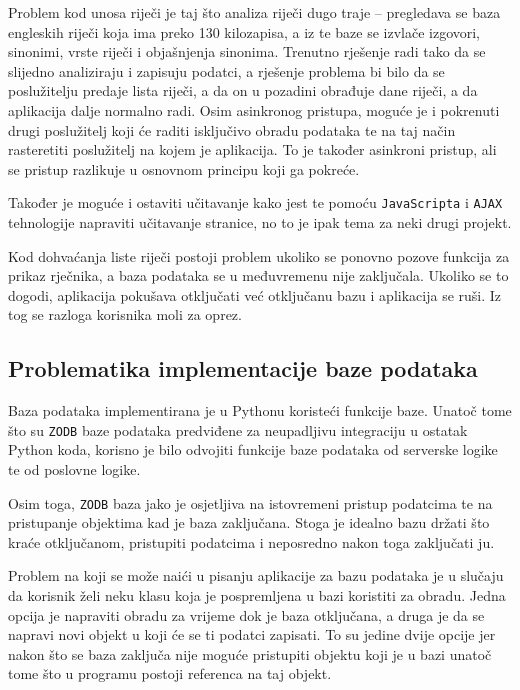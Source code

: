 \documentclass{foi}
\begin{document}
Problem kod unosa riječi je taj što analiza riječi dugo traje -- pregledava se
baza engleskih riječi koja ima preko 130 kilozapisa, a iz te baze se izvlače
izgovori, sinonimi, vrste riječi i objašnjenja sinonima. Trenutno rješenje radi
tako da se slijedno analiziraju i zapisuju podatci, a rješenje problema bi bilo
da se poslužitelju predaje lista riječi, a da on u pozadini obrađuje dane
riječi, a da aplikacija dalje normalno radi. Osim asinkronog pristupa, moguće
je i pokrenuti drugi poslužitelj koji će raditi isključivo obradu podataka te na taj
način rasteretiti poslužitelj na kojem je aplikacija. To je također asinkroni
pristup, ali se pristup razlikuje u osnovnom principu koji ga pokreće.

Također je moguće i ostaviti učitavanje kako jest te pomoću
\texttt{JavaScripta} i \texttt{AJAX} tehnologije napraviti učitavanje stranice,
no to je ipak tema za neki drugi projekt.

Kod dohvaćanja liste riječi postoji problem ukoliko se ponovno pozove funkcija
za prikaz rječnika, a baza podataka se u međuvremenu nije zaključala. Ukoliko
se to dogodi, aplikacija pokušava otključati već otključanu bazu i aplikacija
se ruši. Iz tog se razloga korisnika moli za oprez.

\subsection{Problematika implementacije baze podataka}

Baza podataka implementirana je u Pythonu koristeći funkcije baze. Unatoč tome
što su \texttt{ZODB} baze podataka predviđene za neupadljivu integraciju u
ostatak Python koda, korisno je bilo odvojiti funkcije baze podataka od
serverske logike te od poslovne logike.

Osim toga, \texttt{ZODB} baza jako je osjetljiva na istovremeni pristup
podatcima te na pristupanje objektima kad je baza zaključana. Stoga je idealno
bazu držati što kraće otključanom, pristupiti podatcima i neposredno nakon toga
zaključati ju.

Problem na koji se može naići u pisanju aplikacije za bazu podataka je u
slučaju da korisnik želi neku klasu koja je pospremljena u bazi koristiti za
obradu. Jedna opcija je napraviti obradu za vrijeme dok je baza otključana, a
druga je da se napravi novi objekt u koji će se ti podatci zapisati. To su
jedine dvije opcije jer nakon što se baza zaključa nije moguće pristupiti
objektu koji je u bazi unatoč tome što u programu postoji referenca na taj
objekt.
\end{document}
